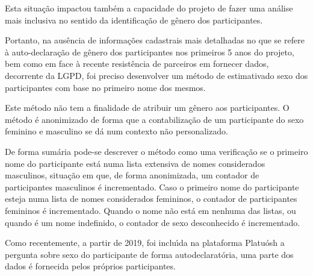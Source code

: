 \documentclass[
12pt,		%
openright,	%
twoside,  %
a4paper,			%
chapter=TITLE,		%
english,			%
french,				%
spanish,			%
brazil				%
]{USPSC-classe/USPSC}
\begin{document}
Esta situa\c{c}\~ao impactou tamb\'em a capacidade do projeto de fazer uma an\'alise mais inclusiva no sentido da identifica\c{c}\~ao de g\^enero dos participantes.










Portanto, na aus\^encia de informa\c{c}\~oes cadastrais mais detalhadas no que se refere \`a auto-declara\c{c}\~ao de g\^enero dos participantes nos primeiros 5 anos do projeto, bem como em face \`a recente resist\^encia de parceiros em fornecer dados, decorrente da LGPD, foi preciso desenvolver um m\'etodo de \textquotedbl estimativa\textquotedbl  do sexo dos participantes com base no primeiro nome dos mesmos.










Este m\'etodo n\~ao tem a finalidade de atribuir um g\^enero aos participantes. O m\'etodo \'e anonimizado de forma que a contabiliza\c{c}\~ao de um participante do sexo feminino e masculino se d\'a num contexto n\~ao personalizado.










De forma sum\'aria pode-se descrever o m\'etodo como uma verifica\c{c}\~ao se o primeiro nome do participante est\'a numa lista extensiva de nomes \textquotedbl considerados masculinos\textquotedbl , situa\c{c}\~ao em que, de forma anonimizada, um contador de participantes masculinos \'e incrementado. Caso o primeiro nome do participante esteja numa lista de nomes \textquotedbl considerados femininos\textquotedbl , o contador de participantes femininos \'e incrementado. Quando o nome n\~ao est\'a em nenhuma das listas, ou quando \'e um nome indefinido, o contador de \textquotedbl sexo desconhecido \'e incrementado\textquotedbl .










Como recentemente, a partir de 2019, foi inclu\'{\i}da na plataforma Platu\'osh a pergunta sobre sexo do participante de forma autodeclarat\'oria, uma parte dos dados \'e fornecida pelos pr\'oprios participantes.
\end{document}

